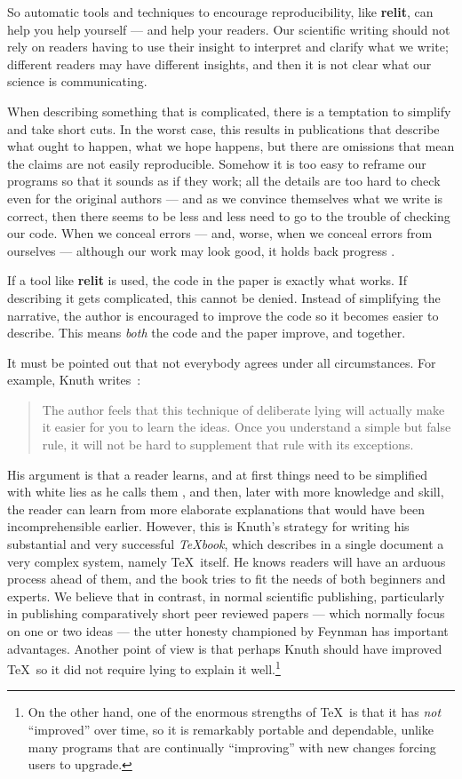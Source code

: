 \documentclass[12pt]{article}
\def\name#1{\textbf{#1}}
\begin{document}
So automatic tools and techniques to encourage reproducibility, like \name{relit}, can help you help yourself --- and help your readers.  Our scientific writing should not rely on readers having to use their insight to interpret and clarify what we write; different readers may have different insights, and then it is not clear what our science is communicating.

When describing something that is complicated, there is a temptation to simplify and take short cuts. In the worst case, this results in publications that describe what ought to happen, what we hope happens, but there are omissions that mean the claims are not easily reproducible. Somehow it is too easy to reframe our programs so that it sounds as if they work; all the details are too hard to check even for the original authors --- and as we convince themselves what we write is correct, then there seems to be less and less need to go to the trouble of checking our code. When we conceal errors --- and, worse, when we conceal errors from ourselves --- although our work may look good, it holds back progress \cite{blackbox}.

If a tool like \name{relit} is used, the code in the paper is exactly what works. If describing it gets complicated, this cannot be denied. Instead of simplifying the narrative, the author is encouraged to improve the code so it becomes easier to describe. This means \emph{both\/} the code and the paper improve, and together.

It must be pointed out that not everybody agrees under all circumstances. For example, Knuth writes~\cite[p\emph{vii}]{texbook}:

\begin{quote}\startquote 
The author feels that this technique of deliberate lying will actually make it easier for you to learn the ideas. Once you understand a simple but false rule, it will not be hard to supplement that rule with its exceptions.\quoteend
\end{quote}

His argument is that a reader learns, and at first things need to be simplified with white lies as he calls them \cite[p44]{texbook}, and then, later with more knowledge and skill, the reader can learn from more elaborate explanations that would have been incomprehensible earlier. However, this is Knuth's strategy for writing his substantial and very successful \emph{\TeX book}, which describes in a single document a very complex system, namely \TeX\ itself. He knows readers will have an arduous process ahead of them, and the book tries to fit the needs of both beginners and experts. We believe that in contrast, in normal scientific publishing, particularly in publishing comparatively short peer reviewed papers --- which normally focus on one or two ideas --- the utter honesty championed by Feynman has important advantages. Another point of view is that perhaps Knuth should have improved \TeX\ so it did not require lying to explain it well.\footnote{On the other hand, one of the enormous strengths of \TeX\ is that it has \emph{not\/} ``improved'' over time, so it is remarkably portable and dependable, unlike many programs that are continually ``improving'' with new changes forcing users to upgrade.}
\end{document}
